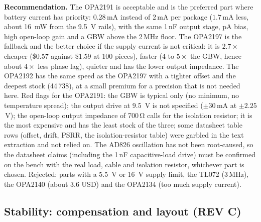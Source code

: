 \documentclass[11pt,a4paper]{article}
\begin{document}
\textbf{Recommendation.}  The OPA2191 is acceptable and is the preferred part where battery
current has priority: $0.28$\,mA instead of $2$\,mA per package ($1.7$\,mA less, about
\SI{16}{\milli\watt} from the \SI{9.5}{\volt} rails), with the same 1\,nF output stage, pA bias,
high open-loop gain and a GBW above the 2\,MHz floor.  The OPA2197 is the fallback and the
better choice if the supply current is not critical: it is $2.7\times$ cheaper
(\$0.57 against \$1.59 at 100 pieces), faster ($4$ to $5\times$ the GBW, hence about $4\times$ less
phase lag), quieter and has the lower output impedance.  The OPA2192 has the same speed as the
OPA2197 with a tighter offset and the deepest stock (44\,738), at a small premium for a precision
that is not needed here.  Red flags for the OPA2191: the GBW is typical only (no minimum, no
temperature spread); the output drive at \SI{9.5}{\volt} is not specified ($\pm30$\,mA at
$\pm2.25$\,V); the open-loop output impedance of 700\,\si{\ohm} calls for the isolation resistor;
it is the most expensive and has the least stock of the three; some datasheet table rows
(offset, drift, PSRR, the isolation-resistor table) were garbled in the text extraction and
not relied on.  The AD826 oscillation has not been root-caused, so the datasheet claims
(including the 1\,nF capacitive-load drive) must be confirmed on the bench with the real load,
cable and isolation resistor, whichever part is chosen.  Rejected: parts with a \SI{5.5}{\volt}
or \SI{16}{\volt} supply limit, the TL072 (3\,MHz), the OPA2140 (about 3.6 USD) and the OPA2134
(too much supply current).

\subsection{Stability: compensation and layout (REV C)}
\end{document}
